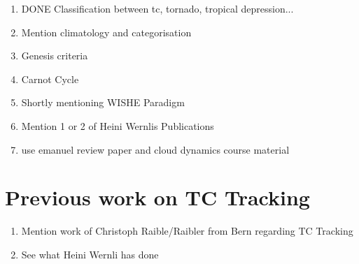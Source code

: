 \begin{enumerate}
\item DONE Classification between tc, tornado, tropical depression...
\item Mention climatology and categorisation
\item Genesis criteria
\item Carnot Cycle
\item Shortly mentioning WISHE Paradigm
\item Mention 1 or 2 of Heini Wernlis Publications
\item use emanuel review paper and cloud dynamics course material
\end{enumerate}


\section{Previous work on TC Tracking}\label{sec:tracking}
\begin{enumerate}
\item Mention work of Christoph Raible/Raibler from Bern regarding TC Tracking
\item See what Heini Wernli has done
\end{enumerate}